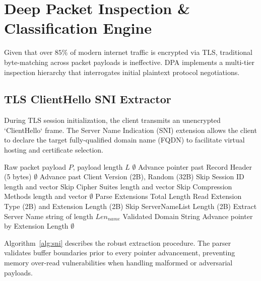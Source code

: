 \documentclass[conference]{IEEEtran}
\begin{document}
\section{Deep Packet Inspection \& Classification Engine}
\label{sec:dpi}
Given that over $85\%$ of modern internet traffic is encrypted via TLS, traditional byte-matching across packet payloads is ineffective. DPA implements a multi-tier inspection hierarchy that interrogates initial plaintext protocol negotiations.

\subsection{TLS ClientHello SNI Extractor}
During TLS session initialization, the client transmits an unencrypted `ClientHello` frame. The Server Name Indication (SNI) extension allows the client to declare the target fully-qualified domain name (FQDN) to facilitate virtual hosting and certificate selection.

\begin{algorithm}[t]
\caption{TLS Server Name Indication (SNI) Extraction}
\label{alg:sni}
\begin{algorithmic}[1]
\REQUIRE Raw packet payload $P$, payload length $L$
    \RETURN $\emptyset$ 
\ENDIF
\STATE Advance pointer past Record Header (5 bytes)
    \RETURN $\emptyset$ 
\ENDIF
\STATE Advance past Client Version (2B), Random (32B)
\STATE Skip Session ID length and vector
\STATE Skip Cipher Suites length and vector
\STATE Skip Compression Methods length and vector
    \RETURN $\emptyset$
\ENDIF
\STATE Parse Extensions Total Length
    \STATE Read Extension Type (2B) and Extension Length (2B)
        \STATE Skip ServerNameList Length (2B)
            \STATE Extract Server Name string of length $Len_{name}$
            \RETURN Validated Domain String
        \ENDIF
    \ENDIF
    \STATE Advance pointer by Extension Length
\ENDWHILE
\RETURN $\emptyset$
\end{algorithmic}
\end{algorithm}

Algorithm~\ref{alg:sni} describes the robust extraction procedure. The parser validates buffer boundaries prior to every pointer advancement, preventing memory over-read vulnerabilities when handling malformed or adversarial payloads.
\end{document}
